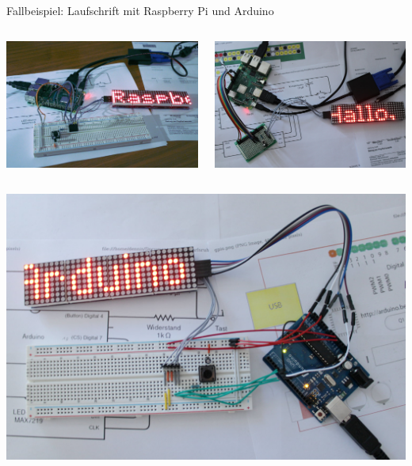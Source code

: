 \begin{frame}{Fallbeispiel: Laufschrift mit Raspberry Pi und Arduino}
    \begin{columns}
        \includegraphics[width=\textwidth]{1-grundlagen/img/laufschrift_pi1}

        \includegraphics[width=\textwidth]{1-grundlagen/img/laufschrift_pi2}
    \end{columns}

    \medskip

    \begin{columns}
        \includegraphics[width=\textwidth]{1-grundlagen/img/laufschrift_arduino1}


\end{columns}
\end{frame}
